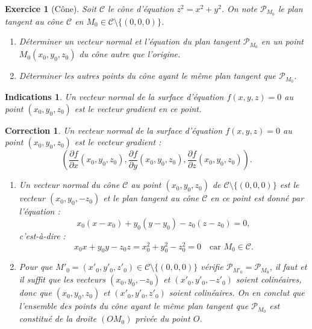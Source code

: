 \documentclass[11pt,a4paper]{article}
\theoremstyle{exostyle}
\newtheorem{exo}{Exercice}
\newtheorem{ind}{Indications}
\newtheorem{cor}{Correction}
\newcommand{\exercice}[1]{} \newcommand{\finexercice}{}
\newcommand{\enonce}{\begin{exo}} \newcommand{\finenonce}{\end{exo}}
\newcommand{\indication}{\begin{ind}} \newcommand{\finindication}{\end{ind}}
\newcommand{\correction}{\begin{cor}} \newcommand{\fincorrection}{\end{cor}}
\begin{document}
\exercice{2631, debievre, 2009/05/19}
\enonce[Cône]
Soit $\mathcal{C}$ le cône d'équation $z^2 = x^2 + y^2$.
On note $\mathcal{P}_{M_0}$ le plan tangent au cône $\mathcal{C}$ en $M_0 \in \mathcal{C} \setminus \{(0, 0, 0)\}$.
\begin{enumerate}
	\item  Déterminer un vecteur normal et l'équation du plan tangent $\mathcal{P}_{M_0}$
	en un point $M_0(x_0,y_0,z_0)$ du cône autre que l'origine.
	\item Déterminer les autres points du cône ayant le même plan tangent que $\mathcal{P}_{M_0}$.
\end{enumerate}
\finenonce

\indication
Un vecteur normal de la surface d'équation $f(x, y, z) = 0$ au point $(x_0, y_0, z_0)$  est le vecteur gradient en ce point.
\finindication

\correction
Un vecteur normal de la surface d'équation $f(x, y, z) = 0$ au point $(x_0, y_0, z_0)$  est le vecteur gradient :
\begin{equation*} \label{normal}
	\left(
	\frac{\partial f}{\partial x}(x_0, y_0, z_0),
	\frac{\partial f}{\partial y}(x_0, y_0, z_0),
	\frac{\partial f}{\partial z}(x_0, y_0, z_0)
	\right).
\end{equation*}

\begin{enumerate} 
	\item  Un vecteur normal du cône $\mathcal{C}$ au point $(x_0, y_0, z_0)$ de $\mathcal{C} \setminus \{(0, 0, 0)\}$
	est le vecteur $(x_0, y_0, -z_0)$ et le plan tangent au cône $\mathcal{C}$ en ce point est donné par l'équation :
	\begin{equation*}
		x_0 (x - x_0) + y_0 (y - y_0) - z_0 (z - z_0) = 0,
	\end{equation*}
	c'est-à-dire :
	\begin{equation*}
		x_0 x + y_0 y - z_0 z =  x_0^2 + y_0^2 - z_0^2  = 0 \quad \text{car } M_0 \in \mathcal{C}.
	\end{equation*}
	
	\item Pour que $M'_0 = (x'_0, y'_0, z'_0) \in \mathcal{C} \setminus \{(0, 0, 0)\}$ vérifie $\mathcal{P}_{M'_0} = \mathcal{P}_{M_0}$,
	il faut et il suffit que les vecteurs $(x_0, y_0, -z_0)$ et $(x'_0, y'_0, -z'_0)$ soient colinéaires,
	donc que $(x_0, y_0, z_0)$ et $(x'_0, y'_0, z'_0)$ soient colinéaires.
	On en conclut que l'ensemble des points du cône ayant le même plan tangent que $\mathcal{P}_{M_0}$ est constitué de la droite $(OM_0)$ privée du point $O$.
\end{enumerate}
\fincorrection
\finexercice
\end{document}
